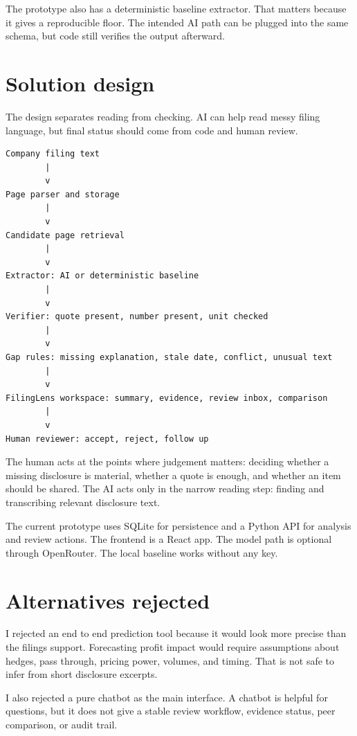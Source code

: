 \documentclass[10pt]{article}
\begin{document}
The prototype also has a deterministic baseline extractor. That matters because it gives a reproducible floor. The intended AI path can be plugged into the same schema, but code still verifies the output afterward.

\section{Solution design}

The design separates reading from checking. AI can help read messy filing language, but final status should come from code and human review.

\begin{verbatim}
Company filing text
        |
        v
Page parser and storage
        |
        v
Candidate page retrieval
        |
        v
Extractor: AI or deterministic baseline
        |
        v
Verifier: quote present, number present, unit checked
        |
        v
Gap rules: missing explanation, stale date, conflict, unusual text
        |
        v
FilingLens workspace: summary, evidence, review inbox, comparison
        |
        v
Human reviewer: accept, reject, follow up
\end{verbatim}

The human acts at the points where judgement matters: deciding whether a missing disclosure is material, whether a quote is enough, and whether an item should be shared. The AI acts only in the narrow reading step: finding and transcribing relevant disclosure text.

The current prototype uses SQLite for persistence and a Python API for analysis and review actions. The frontend is a React app. The model path is optional through OpenRouter. The local baseline works without any key.

\section{Alternatives rejected}

I rejected an end to end prediction tool because it would look more precise than the filings support. Forecasting profit impact would require assumptions about hedges, pass through, pricing power, volumes, and timing. That is not safe to infer from short disclosure excerpts.

I also rejected a pure chatbot as the main interface. A chatbot is helpful for questions, but it does not give a stable review workflow, evidence status, peer comparison, or audit trail.
\end{document}
